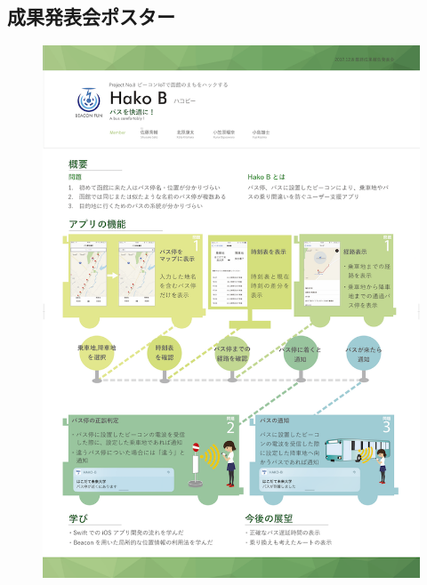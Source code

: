 \documentclass[openany,11pt,papersize]{jsbook}
\begin{document}
\begin{appendix}
\chapter{成果発表会ポスター}
\begin{figure}[htbp]
  \begin{center}
    \includegraphics[clip,width=14cm]{img/final_poster.png}
    \label{fig:poster}
  \end{center}
\end{figure}

  \end{appendix}



  \printbibliography[title=参考文献]

  
\end{document}
